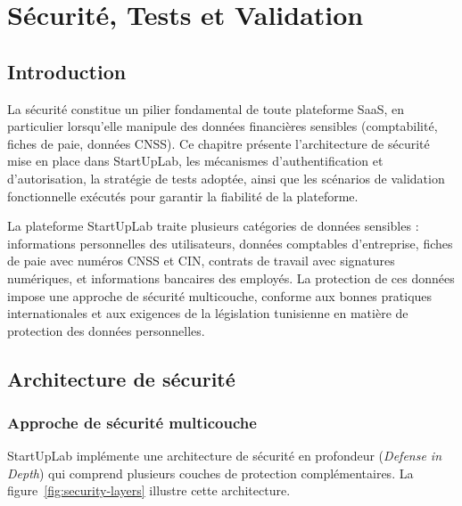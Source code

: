\chapter{Sécurité, Tests et Validation}

\section*{Introduction}

La sécurité constitue un pilier fondamental de toute plateforme SaaS, en particulier lorsqu'elle manipule des données financières sensibles (comptabilité, fiches de paie, données CNSS). Ce chapitre présente l'architecture de sécurité mise en place dans StartUpLab, les mécanismes d'authentification et d'autorisation, la stratégie de tests adoptée, ainsi que les scénarios de validation fonctionnelle exécutés pour garantir la fiabilité de la plateforme.

La plateforme StartUpLab traite plusieurs catégories de données sensibles : informations personnelles des utilisateurs, données comptables d'entreprise, fiches de paie avec numéros CNSS et CIN, contrats de travail avec signatures numériques, et informations bancaires des employés. La protection de ces données impose une approche de sécurité multicouche, conforme aux bonnes pratiques internationales et aux exigences de la législation tunisienne en matière de protection des données personnelles.

\section{Architecture de sécurité}

\subsection{Approche de sécurité multicouche}

StartUpLab implémente une architecture de sécurité en profondeur (\textit{Defense in Depth}) qui comprend plusieurs couches de protection complémentaires. La figure~\ref{fig:security-layers} illustre cette architecture.

